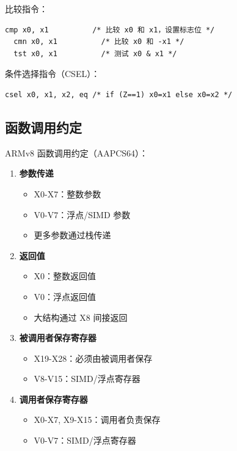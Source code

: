 比较指令：
\begin{lstlisting}[language={[ARM]Assembler}]
  cmp x0, x1          /* 比较 x0 和 x1，设置标志位 */
  cmn x0, x1          /* 比较 x0 和 -x1 */
  tst x0, x1          /* 测试 x0 & x1 */
\end{lstlisting}

条件选择指令（CSEL）：
\begin{lstlisting}[language={[ARM]Assembler}]
  csel x0, x1, x2, eq /* if (Z==1) x0=x1 else x0=x2 */
\end{lstlisting}

\subsection{函数调用约定}


ARMv8 函数调用约定（AAPCS64）：

\begin{enumerate}
  \item \textbf{参数传递}
    \begin{itemize}
      \item X0-X7：整数参数
      \item V0-V7：浮点/SIMD 参数
      \item 更多参数通过栈传递
    \end{itemize}

  \item \textbf{返回值}
    \begin{itemize}
      \item X0：整数返回值
      \item V0：浮点返回值
      \item 大结构通过 X8 间接返回
    \end{itemize}

  \item \textbf{被调用者保存寄存器}
    \begin{itemize}
      \item X19-X28：必须由被调用者保存
      \item V8-V15：SIMD/浮点寄存器
    \end{itemize}

  \item \textbf{调用者保存寄存器}
    \begin{itemize}
      \item X0-X7, X9-X15：调用者负责保存
      \item V0-V7：SIMD/浮点寄存器
    \end{itemize}
\end{enumerate}

